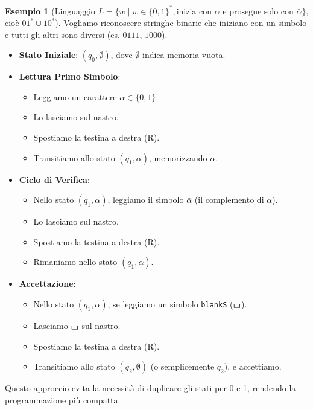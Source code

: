 \documentclass[a4paper]{article}
\theoremstyle{definition} %
\newtheorem{example}{Esempio}
\newcommand{\blankS}{\ensuremath{\raisebox{-0.15ex}{\scalebox{1.3}[0.7]{$\sqcup$}}}}
\begin{document}
\begin{example}[Linguaggio $L = \{w \mid w \in \{0,1\}^*, \text{inizia con } \alpha \text{ e prosegue solo con } \bar{\alpha} \}$, cioè $01^* \cup 10^*$]
Vogliamo riconoscere stringhe binarie che iniziano con un simbolo e tutti gli altri sono diversi (es. $0111$, $1000$).
\begin{itemize}
    \item \textbf{Stato Iniziale}: $(q_0, \emptyset)$, dove $\emptyset$ indica memoria vuota.
    \item \textbf{Lettura Primo Simbolo}:
        \begin{itemize}
            \item Leggiamo un carattere $\alpha \in \{0,1\}$.
            \item Lo lasciamo sul nastro.
            \item Spostiamo la testina a destra (R).
            \item Transitiamo allo stato $(q_1, \alpha)$, memorizzando $\alpha$.
        \end{itemize}
    \item \textbf{Ciclo di Verifica}:
        \begin{itemize}
            \item Nello stato $(q_1, \alpha)$, leggiamo il simbolo $\bar{\alpha}$ (il complemento di $\alpha$).
            \item Lo lasciamo sul nastro.
            \item Spostiamo la testina a destra (R).
            \item Rimaniamo nello stato $(q_1, \alpha)$.
        \end{itemize}
    \item \textbf{Accettazione}:
        \begin{itemize}
            \item Nello stato $(q_1, \alpha)$, se leggiamo un simbolo \texttt{blankS} ($\blankS$).
            \item Lasciamo $\blankS$ sul nastro.
            \item Spostiamo la testina a destra (R).
            \item Transitiamo allo stato $(q_2, \emptyset)$ (o semplicemente $q_2$), e accettiamo.
        \end{itemize}
\end{itemize}
Questo approccio evita la necessità di duplicare gli stati per 0 e 1, rendendo la programmazione più compatta.
\end{example}
\end{document}
